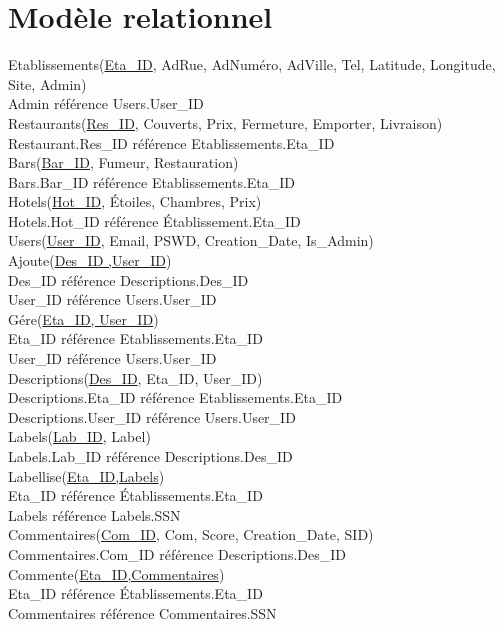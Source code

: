 \section{Modèle relationnel}

\noindent Etablissements(\underline{Eta\_ID}, AdRue, AdNuméro, AdVille, Tel, Latitude, Longitude, Site, Admin)\\
\indent Admin référence Users.User\_ID\\
Restaurants(\underline{Res\_ID}, Couverts, Prix, Fermeture, Emporter, Livraison)\\
\indent Restaurant.Res\_ID référence Etablissements.Eta\_ID\\
Bars(\underline{Bar\_ID}, Fumeur, Restauration)\\
\indent Bars.Bar\_ID référence Etablissements.Eta\_ID\\
Hotels(\underline{Hot\_ID}, Étoiles, Chambres, Prix)\\
\indent Hotels.Hot\_ID référence Établissement.Eta\_ID\\
Users(\underline{User\_ID}, Email, PSWD, Creation\_Date, Is\_Admin)\\
Ajoute(\underline{Des\_ID ,User\_ID})\\
\indent Des\_ID référence Descriptions.Des\_ID\\
\indent User\_ID référence Users.User\_ID\\
Gére(\underline{Eta\_ID, User\_ID})\\
\indent Eta\_ID référence Etablissements.Eta\_ID\\
\indent User\_ID référence Users.User\_ID\\
Descriptions(\underline{Des\_ID}, Eta\_ID, User\_ID)\\
\indent Descriptions.Eta\_ID référence Etablissements.Eta\_ID\\
\indent Descriptions.User\_ID référence Users.User\_ID\\
Labels(\underline{Lab\_ID}, Label)\\
\indent Labels.Lab\_ID référence Descriptions.Des\_ID\\
Labellise(\underline{Eta\_ID,Labels})\\
\indent Eta\_ID référence Établissements.Eta\_ID\\
\indent Labels référence Labels.SSN\\
Commentaires(\underline{Com\_ID}, Com, Score, Creation\_Date, SID)\\
\indent Commentaires.Com\_ID référence Descriptions.Des\_ID\\
Commente(\underline{Eta\_ID,Commentaires})\\
\indent Eta\_ID référence Établissements.Eta\_ID\\
\indent Commentaires référence Commentaires.SSN\\
\pagebreak
